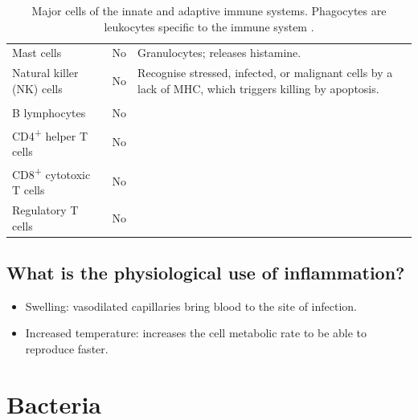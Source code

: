 \begin{table}[htbp]
\begin{tabularx}{\textwidth}{
    @{}
    >{\RaggedRight\arraybackslash}p{2.9cm}
    >{\Centering\arraybackslash}p{1.8cm}
    >{\RaggedRight\arraybackslash}X
    @{}
}
    \hspace*{0.3cm}Mast cells &
    No & Granulocytes; releases histamine.
    \\

    \hspace*{0.3cm}Natural killer (NK) cells &
    No &
    Recognise stressed, infected, or malignant cells by a lack of MHC, which triggers killing by apoptosis. \\

    \addlinespace[4pt]
    \multicolumn{3}{@{}l}{\textbf{Adaptive immune cells}} \\
    \cmidrule(lr){1-3}

    \hspace*{0.3cm}B lymphocytes &
    No &
     \\

    \hspace*{0.3cm}CD4\textsuperscript{+} helper T cells &
    No &
     \\

    \hspace*{0.3cm}CD8\textsuperscript{+} cytotoxic T cells &
    No &
    \\

    \hspace*{0.3cm}Regulatory T cells &
    No &
     \\

    \bottomrule
\end{tabularx}

\caption{Major cells of the innate and adaptive immune systems. Phagocytes are leukocytes specific to the immune system \cite[5:20]{CrashCourseImmune2}.}
\label{tab:immune-cells}

\end{table}


\subsection{What is the physiological use of inflammation?}

\begin{itemize}
    \item Swelling: vasodilated capillaries bring blood to the site of infection.
    \item Increased temperature: increases the cell metabolic rate to be able to reproduce faster. \cite[7:44]{CrashCourseImmune1}
\end{itemize}



\section{Bacteria}

